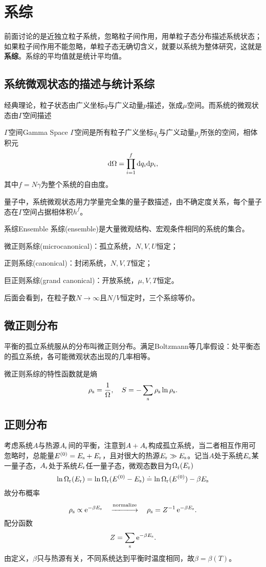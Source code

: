 \section{系综}
前面讨论的是近独立粒子系统，忽略粒子间作用，用单粒子态分布描述系统状态；如果粒子间作用不能忽略，单粒子态无确切含义，就要以系统为整体研究，这就是\textbf{系综}。系综的平均值就是统计平均值。
\subsection{系统微观状态的描述与统计系综}
经典理论，粒子状态由广义坐标$q$与广义动量$p$描述，张成$\mu$空间。而系统的微观状态由$\varGamma$空间描述
\begin{definition}{$\varGamma$空间}{Gamma Space}
	$\varGamma$空间是所有粒子广义坐标$q_i$与广义动量$p_i$所张的空间，相体积元
	\begin{align}
		\mathop{}\!\mathrm{d}\Omega=\prod_{i=1}^f\mathop{}\!\mathrm{d} q_i\mathrm{d} p_i,
	\end{align}
	其中$f=N\gamma$为整个系统的自由度。
\end{definition}
量子中，系统微观状态用力学量完全集的量子数描述，由不确定度关系，每个量子态在$\varGamma$空间占据相体积$h^f$。
\begin{definition}{系综}{Ensemble}
	系综(ensemble)是大量微观结构、宏观条件相同的系统的集合。
	\begin{compactitem}
		\item 微正则系综(microcanonical)：孤立系统，$N,V,U$恒定；
		\item 正则系综(canonical)：\qquad\quad\enspace 封闭系统，$N,V,T$恒定；
		\item 巨正则系综(grand canonical)：开放系统，$\mu,V,T$恒定。
	\end{compactitem}
\end{definition}
后面会看到，在粒子数$N\to\infty$且$N/V$恒定时，三个系综等价。
\subsection{微正则分布}
平衡的孤立系统服从的分布叫微正则分布。满足Boltzmann等几率假设：处平衡态的孤立系统，各可能微观状态出现的几率相等。

微正则系综的特性函数就是熵
\[
	\rho_\mathrm s=\frac1\Omega,\quad S=-\sum_\mathrm s\rho_\mathrm s\ln\rho_\mathrm s.
\]
\subsection{正则分布}
考虑系统$A$与热源$A_\mathrm r$间的平衡，注意到$A+A_\mathrm r$构成孤立系统，当二者相互作用可忽略时，总能量$E^{(0)}=E_\mathrm s+E_\mathrm r$，且对很大的热源$E_\mathrm r\gg E_\mathrm s$。记当$A$处于系统$E_\mathrm s$某一量子态，$A_\mathrm r$处于系统$E_\mathrm r$任一量子态，微观态数目为$\Omega_\mathrm r(E_\mathrm r)$
\[
	\ln\Omega_\mathrm r(E_\mathrm r)=\ln\Omega_\mathrm r(E^{(0)}-E_\mathrm s)\doteq\ln\Omega_\mathrm r(E^{(0)})-\beta E_\mathrm s
\]
故分布概率
\[
	\rho_\st\propto\e{-\beta E_\st}\normalize\rho_\st=Z^{-1}\e{-\beta E_\st}.
\]
配分函数
\[
	Z=\sum_\mathrm s\mathop{}\!\mathrm{e}^{-\beta E_\mathrm s}.
\]
由定义，$\beta$只与热源有关，不同系统达到平衡时温度相同，故$\beta=\beta(T)$。

